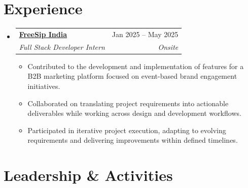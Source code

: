 \documentclass[letterpaper,11pt]{article}
\makeatletter
\newcommand{\resumeItem}[1]{
  \item\small{
    {#1 \vspace{-2pt}}
  }
}
\newcommand{\resumeSubheading}[4]{
  \vspace{-2pt}\item
    \begin{tabular*}{0.97\textwidth}[t]{l@{\extracolsep{\fill}}r}
      \textbf{#1} & #2 \\
      \textit{\small#3} & \textit{\small #4} \\
    \end{tabular*}\vspace{-7pt}
}
\newcommand{\resumeSubHeadingListStart}{\begin{itemize}[leftmargin=0.15in, label={}]}
\newcommand{\resumeSubHeadingListEnd}{\end{itemize}}
\newcommand{\resumeItemListStart}{\begin{itemize}}
\newcommand{\resumeItemListEnd}{\end{itemize}\vspace{-5pt}}
\makeatother
\begin{document}
\vspace{-10pt}


\section{Experience}

\resumeSubHeadingListStart

\resumeSubheading
{\href{https://www.freesipindia.xyz}{\underline{FreeSip India}}}{Jan 2025 -- May 2025}
{Full Stack Developer Intern}{Onsite}

\resumeItemListStart

\resumeItem{Contributed to the development and implementation of features for a B2B marketing platform focused on event-based brand engagement initiatives.}

\resumeItem{Collaborated on translating project requirements into actionable deliverables while working across design and development workflows.}

\resumeItem{Participated in iterative project execution, adapting to evolving requirements and delivering improvements within defined timelines.}

\resumeItemListEnd

\resumeSubHeadingListEnd


\section{Leadership \& Activities}
\end{document}
